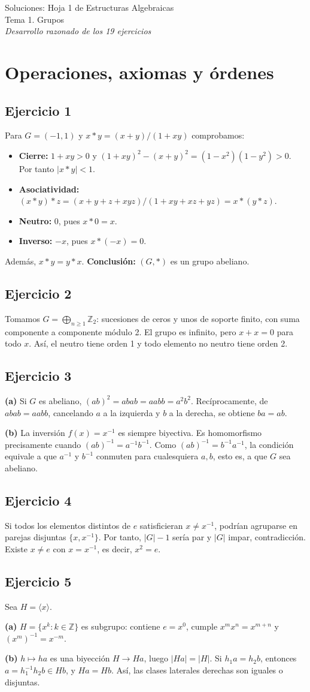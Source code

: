 \documentclass[11pt,a4paper]{article}
\newcommand{\Z}{\mathbb Z}
\newcommand{\ej}[1]{\subsection*{Ejercicio #1}}
\begin{document}
\begin{center}{\LARGE Soluciones: Hoja 1 de Estructuras Algebraicas}\\[4pt]
{\large Tema 1. Grupos}\\[6pt]
\emph{Desarrollo razonado de los 19 ejercicios}
\end{center}
\section{Operaciones, axiomas y órdenes}
\ej{1}
Para $G=(-1,1)$ y $x*y=(x+y)/(1+xy)$ comprobamos:
\begin{itemize}
\item \textbf{Cierre:} $1+xy>0$ y $(1+xy)^2-(x+y)^2=(1-x^2)(1-y^2)>0$. Por tanto $|x*y|<1$.
\item \textbf{Asociatividad:} $(x*y)*z=(x+y+z+xyz)/(1+xy+xz+yz)=x*(y*z)$.
\item \textbf{Neutro:} $0$, pues $x*0=x$.
\item \textbf{Inverso:} $-x$, pues $x*(-x)=0$.
\end{itemize}
Además, $x*y=y*x$. \textbf{Conclusión:} $(G,*)$ es un grupo abeliano.
\ej{2}
Tomamos $G=\bigoplus_{n\geq1}\Z_2$: sucesiones de ceros y unos de soporte finito, con suma componente a componente módulo 2. El grupo es infinito, pero $x+x=0$ para todo $x$. Así, el neutro tiene orden 1 y todo elemento no neutro tiene orden 2.
\ej{3}
\textbf{(a)} Si $G$ es abeliano, $(ab)^2=abab=aabb=a^2b^2$. Recíprocamente, de $abab=aabb$, cancelando $a$ a la izquierda y $b$ a la derecha, se obtiene $ba=ab$.

\textbf{(b)} La inversión $f(x)=x^{-1}$ es siempre biyectiva. Es homomorfismo precisamente cuando $(ab)^{-1}=a^{-1}b^{-1}$. Como $(ab)^{-1}=b^{-1}a^{-1}$, la condición equivale a que $a^{-1}$ y $b^{-1}$ conmuten para cualesquiera $a,b$, esto es, a que $G$ sea abeliano.
\ej{4}
Si todos los elementos distintos de $e$ satisficieran $x\neq x^{-1}$, podrían agruparse en parejas disjuntas $\{x,x^{-1}\}$. Por tanto, $|G|-1$ sería par y $|G|$ impar, contradicción. Existe $x\neq e$ con $x=x^{-1}$, es decir, $x^2=e$.
\ej{5}
Sea $H=\langle x\rangle$.

\textbf{(a)} $H=\{x^k:k\in\Z\}$ es subgrupo: contiene $e=x^0$, cumple $x^mx^n=x^{m+n}$ y $(x^m)^{-1}=x^{-m}$.

\textbf{(b)} $h\mapsto ha$ es una biyección $H\to Ha$, luego $|Ha|=|H|$. Si $h_1a=h_2b$, entonces $a=h_1^{-1}h_2b\in Hb$, y $Ha=Hb$. Así, las clases laterales derechas son iguales o disjuntas.
\end{document}
